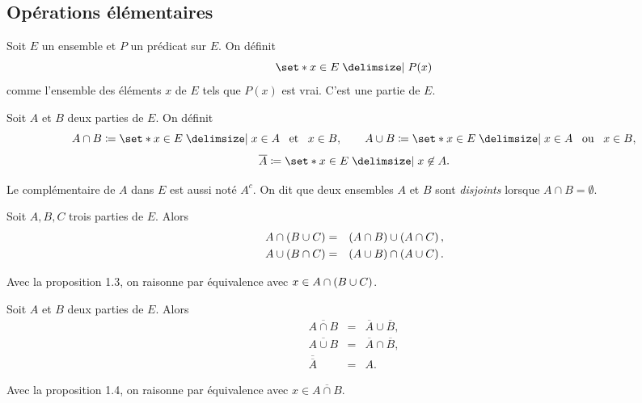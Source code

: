 \documentclass{magnolia}
\begin{document}
\subsection{Opérations élémentaires}

\begin{definition}[utile=-3]
Soit $E$ un ensemble et $P$ un prédicat sur $E$. On définit
\[\enstq{x\in E}{P(x)}\]
comme l'ensemble des éléments $x$ de $E$ tels que $P(x)$ est vrai. C'est une partie
de $E$.
\end{definition}

\begin{definition}[utile=-3]
Soit $A$ et $B$ deux parties de $E$. On définit
\[A\cap B\defeq\enstq{x\in E}{x\in A \et x\in B}, \qquad
  A\cup B\defeq\enstq{x\in E}{x\in A \ou x\in B},\]
\[\overline{A}\defeq\enstq{x\in E}{x\not\in A}.\]
\end{definition}

\begin{remarques}
\remarque Le complémentaire de $A$ dans $E$ est aussi noté $A^c$.
\remarque On dit que deux ensembles $A$ et $B$ sont \emph{disjoints} lorsque
  $A\cap B=\emptyset$.
\end{remarques}

\begin{proposition}[utile=-3]
Soit $A, B, C$ trois parties de $E$. Alors
\begin{eqnarray*}
A\cap\left(B\cup C\right)&=&\left(A\cap B\right)\cup\left(A\cap C\right),\\
A\cup\left(B\cap C\right)&=&\left(A\cup B\right)\cap\left(A\cup C\right).
\end{eqnarray*}
\end{proposition}

\begin{preuve}
Avec la proposition 1.3, on raisonne par équivalence avec $x\in A\cap\left(B\cup C\right)$.
\end{preuve}

\begin{proposition}[utile=-3, nom={Lois de \nom{Morgan}}]
Soit $A$ et $B$ deux parties de $E$. Alors
\begin{eqnarray*}
\overline{A\cap B}&=&\overline{A}\cup \overline{B},\\
\overline{A\cup B}&=&\overline{A}\cap \overline{B},\\
\overline{\overline{A}}&=&A.
\end{eqnarray*}
\end{proposition}

\begin{preuve}
Avec la proposition 1.4, on raisonne par équivalence avec $x\in \overline{A\cap B}$.
\end{preuve}
\end{document}
